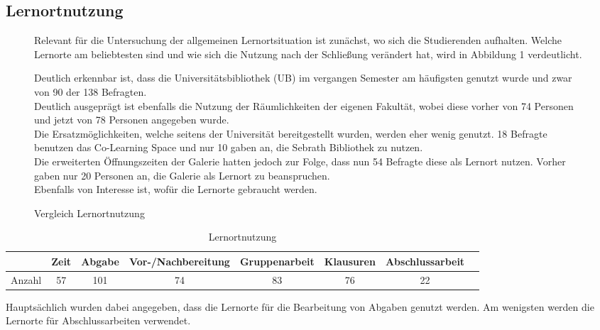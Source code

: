 \documentclass[11pt, a4paper]{article}
\begin{document}
\subsection{Lernortnutzung}
\begin{figure}[h]
Relevant für die Untersuchung der allgemeinen Lernortsituation ist zunächst, wo sich die Studierenden aufhalten. Welche Lernorte am beliebtesten sind und wie sich die Nutzung nach der Schließung verändert hat, wird in Abbildung 1 verdeutlicht.

 
 \caption{Vergleich Lernortnutzung}
\leavevmode

Deutlich erkennbar ist, dass die Universitätsbibliothek (UB) im vergangen Semester am häufigsten genutzt wurde und zwar von 90 der 138 Befragten.\\
Deutlich ausgeprägt ist ebenfalls die Nutzung der Räumlichkeiten der eigenen Fakultät, wobei diese vorher von 74 Personen und jetzt von 78 Personen angegeben wurde. \\
Die Ersatzmöglichkeiten, welche seitens der Universität bereitgestellt wurden, werden eher wenig genutzt. 18 Befragte benutzen das Co-Learning Space und nur 10 gaben an, die Sebrath Bibliothek zu nutzen.\\
Die erweiterten Öffnungszeiten der Galerie hatten jedoch zur Folge, dass nun 54 Befragte diese als Lernort nutzen. Vorher gaben nur 20 Personen an, die Galerie als Lernort zu beanspruchen.\\


Ebenfalls von Interesse ist, wofür die Lernorte gebraucht werden. 

\end{figure}
\begin{table}[h]
	\begin{tabular}{c|ccccccc}
		& Zeit & Abgabe & Vor-/Nachbereitung & Gruppenarbeit & Klausuren & Abschlussarbeit \\ \hline
		Anzahl & 57            & 101             & 74                          & 83                     & 76                 & 22                      
	\end{tabular}
		\caption{Lernortnutzung}
\end{table}

Hauptsächlich wurden dabei angegeben, dass die Lernorte für die Bearbeitung von Abgaben genutzt werden. Am wenigsten werden die Lernorte für Abschlussarbeiten verwendet.
\leavevmode
\end{document}
